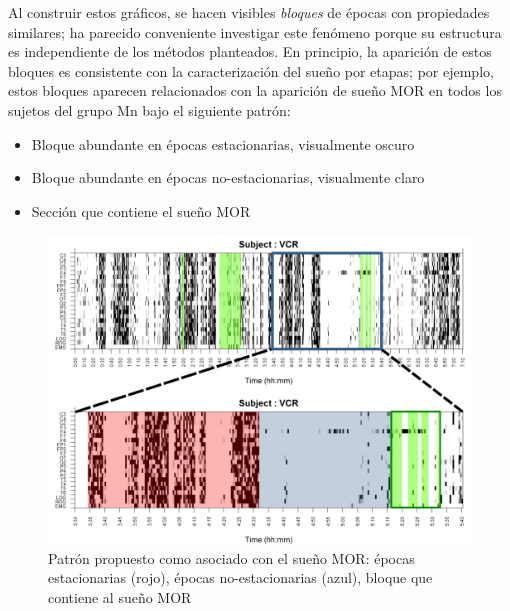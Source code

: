 
Al construir estos gráficos, se hacen visibles \textit{bloques} de épocas con propiedades 
similares; ha parecido conveniente investigar este fenómeno porque su estructura es independiente 
de los métodos planteados. En principio, la aparición de estos bloques es consistente con la
caracterización del sueño por etapas; por ejemplo,
estos bloques aparecen relacionados con la aparición de sueño MOR en todos los 
sujetos del grupo Mn bajo el siguiente patrón:
\begin{itemize}
\item Bloque abundante en épocas estacionarias, visualmente oscuro
\item Bloque abundante en épocas no-estacionarias, visualmente claro
\item Sección que contiene el sueño MOR
\end{itemize}

\begin{figure}
\includegraphics[width=\textwidth]
{./img_ejemplos/zoom_VCR.pdf}
\caption{Patrón propuesto como asociado con el sueño MOR: épocas estacionarias 
(rojo), épocas no-estacionarias (azul), bloque que contiene al sueño MOR}
\label{patroncito}
\end{figure}

